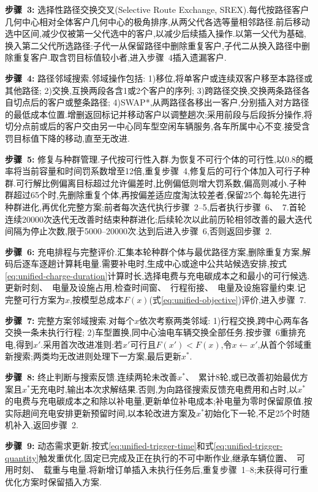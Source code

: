 \documentclass{setp-new}
\begin{document}
\textbf{步骤~3: }选择性路径交换交叉(Selective Route Exchange, SREX)\cite{ref:srex}.每代按路径客户几何中心相对全体客户几何中心的极角排序,从两父代各选等量相邻路径.前后移动选中区间,减少仅被第一父代选中的客户,以减少后续插入操作.以第一父代为基础,换入第二父代所选路径:子代一从保留路径中删除重复客户,子代二从换入路径中删除重复客户.取含罚目标值较小者,进入步骤~4插入遗漏客户.

\textbf{步骤~4: }路径邻域搜索.邻域操作包括: 1)移位,将单客户或连续双客户移至本路径或其他路径; 2)交换,互换两段各含1或2个客户的序列; 3)跨路径交换,交换两条路径各自切点后的客户或整条路径; 4)SWAP*\cite{ref:hgs-cvrp-2022},从两路径各移出一客户,分别插入对方路径的最低成本位置.增删返回标记并移动客户以调整趟次;采用前段与后段拆分操作\cite{ref:hgamp2026},将切分点前或后的客户交由另一中心同车型空闲车辆服务,各车所属中心不变.接受含罚目标值下降的移动,直至无改进.

\textbf{步骤~5: }修复与种群管理.子代按可行性入群.为恢复不可行个体的可行性,以0.8的概率将当前容量和时间罚系数增至12倍,重复步骤~4,修复后的可行个体加入可行子种群.可行解比例偏离目标超过允许偏差时,比例偏低则增大罚系数,偏高则减小.子种群超过65个时,先删除重复个体,再按偏差适应度淘汰较差者,保留25个.每轮先进行种群进化,再优化完整方案;前者每次迭代执行步骤~2--5,后者执行步骤~6、~7.首轮连续20000次迭代无改善时结束种群进化;后续轮次以此前历轮相邻改善的最大迭代间隔为停止次数,限于5000--20000次.达到后进入步骤~6,否则返回步骤~2.

\textbf{步骤~6: }充电排程与完整评价.汇集本轮种群个体与最优路径方案,删除重复方案,解码后逐车逐趟计算耗电量.需要补电时,生成中心或途中公共站候选安排,按式\eqref{eq:unified-charge-duration}计算时长,选择电费与充电碳成本之和最小的可行候选.更新时刻、~电量及设施占用,检查时间窗、~行程衔接、~电量及设施容量约束.记完整可行方案为$x$,按模型总成本$F(x)$(式\eqref{eq:unified-objective})评价,进入步骤~7.

\textbf{步骤~7: }完整方案邻域搜索.对每个$x$依次考察两类邻域: 1)行程交换,跨中心两车各交换一条未执行行程; 2)车型置换,同中心油电车辆交换全部任务.按步骤~6重排充电,得到$x'$.采用首次改进准则:若$x'$可行且$F(x')<F(x)$,令$x\leftarrow x'$,从首个邻域重新搜索;两类均无改进则处理下一方案,最后更新$x^*$.

\textbf{步骤~8: }终止判断与搜索反馈.连续两轮未改善$x^*$、~累计8轮,或已改善初始最优方案且$x^*$无充电时,输出本次求解结果.否则,为向路径搜索反馈充电费用和占时,以$x^*$的电费与充电碳成本之和除以补电量,更新单位补电成本;补电量为零时保留原值.按实际趟间充电安排更新预留时间,以本轮改进方案及$x^*$初始化下一轮,不足25个时随机补入,返回步骤~2.

\textbf{步骤~9: }动态需求更新.按式\eqref{eq:unified-trigger-time}和式\eqref{eq:unified-trigger-quantity}触发重优化,固定已完成及正在执行的不可中断作业,继承车辆位置、~可用时刻、~载重与电量.将新增订单插入未执行任务后,重复步骤~1--8;未获得可行重优化方案时保留插入方案.
\end{document}
